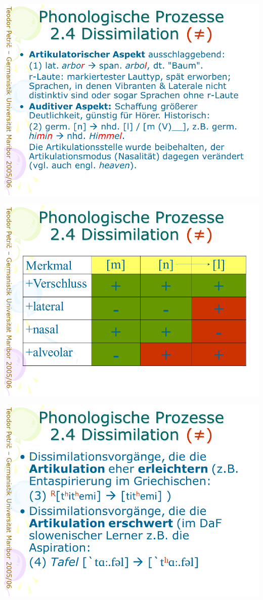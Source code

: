 \documentclass[
  letterpaper,
]{scrbook}
\begin{document}
\includegraphics[width=1\textwidth,height=\textheight]{./pictures/prozesse/prozesse_21.PNG}

\includegraphics[width=1\textwidth,height=\textheight]{./pictures/prozesse/prozesse_22.PNG}

\includegraphics[width=1\textwidth,height=\textheight]{./pictures/prozesse/prozesse_23.PNG}
\end{document}
